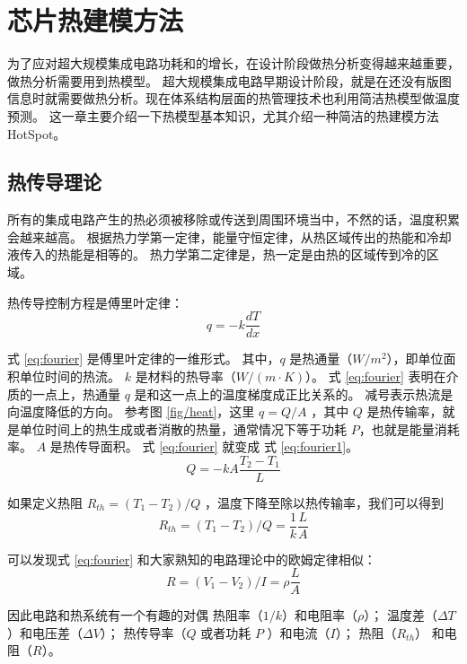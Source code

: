 
\chapter{芯片热建模方法}

为了应对超大规模集成电路功耗和的增长，在设计阶段做热分析变得越来越重要，做热分析需要用到热模型。
超大规模集成电路早期设计阶段，就是在还没有版图信息时就需要做热分析。现在体系结构层面的热管理技术也利用简洁热模型做温度预测。
这一章主要介绍一下热模型基本知识，尤其介绍一种简洁的热建模方法HotSpot。

\section{热传导理论}\label{sec:thermal}
所有的集成电路产生的热必须被移除或传送到周围环境当中，不然的话，温度积累会越来越高。
根据热力学第一定律，能量守恒定律，从热区域传出的热能和冷却液传入的热能是相等的。
热力学第二定律是，热一定是由热的区域传到冷的区域。

热传导控制方程是傅里叶定律：
\begin{equation}\label{eq:fourier}
q = -k\frac{dT}{dx}
\end{equation}

式 \eqref{eq:fourier} 是傅里叶定律的一维形式。
其中，$ q $ 是热通量（$W/m^2$），即单位面积单位时间的热流。 $k $ 是材料的热导率（$W/(m \cdot K)$）。
式 \eqref{eq:fourier} 表明在介质的一点上，热通量 $q$ 是和这一点上的温度梯度成正比关系的。
减号表示热流是向温度降低的方向。
参考图 \ref{fig/heat}，这里 $q = Q/A $ ，其中 $Q$ 是热传输率，就是单位时间上的热生成或者消散的热量，通常情况下等于功耗 $P$，也就是能量消耗率。 
$A$ 是热传导面积。 式 \eqref{eq:fourier} 就变成 式 \eqref{eq:fourier1}。
\begin{equation}\label{eq:fourier1}
Q = -kA\frac{T_2-T_1}{L}
\end{equation}

如果定义热阻 $R_{th} = (T_1 -T_2)/Q$ ，温度下降至除以热传输率，我们可以得到
\begin{equation}\label{eq:Rth}
R_{th} = (T_1-T_2)/Q = \frac{1}{k}\frac{L}{A}
\end{equation}

可以发现式 \eqref{eq:fourier} 和大家熟知的电路理论中的欧姆定律相似：
\begin{equation}\label{eq:Ohm}
R = (V_1-V_2)/I = \rho \frac{L}{A}
\end{equation}

因此电路和热系统有一个有趣的对偶 \raisebox{0.5mm}{------}热阻率（$1/k$）和电阻率（$\rho$）；
温度差（$\Delta T$）和电压差（$\Delta V$）；
热传导率（$Q$ 或者功耗 $P$ ）和电流（$I$）；
热阻（$R_{th}$） 和电阻（$R$）。

